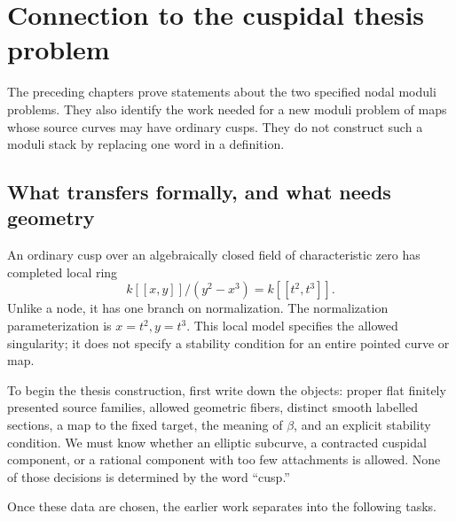\chapter{Connection to the cuspidal thesis problem}\label{ch:cusps}

The preceding chapters prove statements about the two specified
nodal moduli problems. They also identify the work needed for a
new moduli problem of maps whose source curves may have ordinary
cusps. They do not construct such a moduli stack by replacing one
word in a definition.

\section{What transfers formally, and what needs geometry}

An ordinary cusp over an algebraically closed field of characteristic
zero has completed local ring
\[
                   k[[x,y]]/(y^2-x^3)=k[[t^2,t^3]].
\]
Unlike a node, it has one branch on normalization. The normalization
parameterization is $x=t^2,y=t^3$. This local model specifies the
allowed singularity; it does not specify a stability condition for
an entire pointed curve or map.

To begin the thesis construction, first write down the objects:
proper flat finitely presented source families, allowed geometric
fibers, distinct smooth labelled sections, a map to the fixed target,
the meaning of $\beta$, and an explicit stability condition. We
must know whether an elliptic subcurve, a contracted cuspidal
component, or a rational component with too few attachments is
allowed. None of those decisions is determined by the word ``cusp.''

Once these data are chosen, the earlier work separates into the
following tasks.

